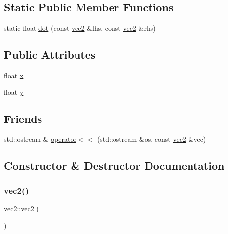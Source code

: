 \subsection*{Static Public Member Functions}
\begin{DoxyCompactItemize}
\item 
static float \hyperlink{structvec2_a7bb0dddaf76881c9e2cbc05c5fd6bc4b}{dot} (const \hyperlink{structvec2}{vec2} \&lhs, const \hyperlink{structvec2}{vec2} \&rhs)
\end{DoxyCompactItemize}
\subsection*{Public Attributes}
\begin{DoxyCompactItemize}
\item 
float \hyperlink{structvec2_a002d3519d48fe3cd79729b5b0ded74bf}{x}
\item 
float \hyperlink{structvec2_a6d28b12b511da692550fc9d37b4e9b1d}{y}
\end{DoxyCompactItemize}
\subsection*{Friends}
\begin{DoxyCompactItemize}
\item 
std\+::ostream \& \hyperlink{structvec2_a85b47f3582472fa5e3f80e6efd59f1d6}{operator$<$$<$} (std\+::ostream \&os, const \hyperlink{structvec2}{vec2} \&vec)
\end{DoxyCompactItemize}


\subsection{Constructor \& Destructor Documentation}
\mbox{\label{structvec2_ae12a1a221eca3561809600a11b58eaa3}} 
\subsubsection{\texorpdfstring{vec2()}{vec2()}\hspace{0.1cm}{\footnotesize\ttfamily [1/3]}}
{\footnotesize\ttfamily vec2\+::vec2 (\begin{DoxyParamCaption}{ }\end{DoxyParamCaption})}

\mbox{\label{structvec2_a6a3b46530cd2ed011bb5cdbbec62be26}} 
